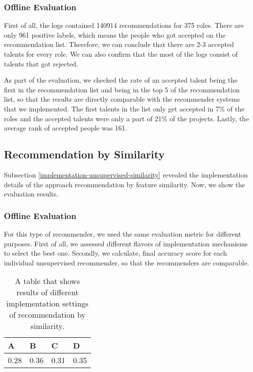 \subsubsection{Offline Evaluation}

First of all, the logs contained 140914 recommendations for 375 roles. There are only 961 positive labels, which means the people who got accepted on the recommendation list. Therefore, we can conclude that there are 2-3 accepted talents for every role. We can also confirm that the most of the logs consist of talents that got rejected. 

As part of the evaluation, we checked the rate of an accepted talent being the first in the recommendation list and being in the top 5 of the recommendation list, so that the results are directly comparable with the recommender systems that we implemented. The first talents in the list only get accepted in 7\% of the roles and the accepted talents were only a part of 21\% of the projects. Lastly, the average rank of accepted people was 161. 

\subsection{Recommendation by Similarity}

Subsection \ref{implementation-unsupervised-similarity} revealed the implementation details of the approach recommendation by feature similarity. Now, we show the evaluation results. 

\subsubsection{Offline Evaluation}

For this type of recommender, we used the same evaluation metric for different purposes. First of all, we assessed different flavors of implementation mechanisms to select the best one. Secondly, we calculate, final accuracy score for each individual unsupervised recommender, so that the recommenders are comparable.

\begin{table}[htpb]
	\caption[Evaluation mid-results]{A table that shows results of different implementation settings of recommendation by similarity.}\label{tab:evaluation-rec-similarity}
	\centering
	\begin{tabular}{l l l l}
		\toprule
		A & B & C & D \\
		\midrule
		0.28 & 0.36 & 0.31 & 0.35 \\
		\bottomrule
	\end{tabular}
\end{table}

